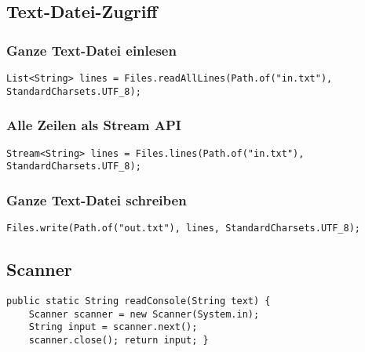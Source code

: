 \begin{multicols*}{5}
		\subsection{Text-Datei-Zugriff}
			\subsubsection{Ganze Text-Datei einlesen}
				\begin{lstlisting}
List<String> lines = Files.readAllLines(Path.of("in.txt"), StandardCharsets.UTF_8);
				\end{lstlisting}
			\subsubsection{Alle Zeilen als Stream API}
				\begin{lstlisting}
Stream<String> lines = Files.lines(Path.of("in.txt"), StandardCharsets.UTF_8);
				\end{lstlisting}
			\subsubsection{Ganze Text-Datei schreiben}
				\begin{lstlisting}
Files.write(Path.of("out.txt"), lines, StandardCharsets.UTF_8);
				\end{lstlisting}

		\subsection{Scanner}
		\begin{lstlisting}
public static String readConsole(String text) {
	Scanner scanner = new Scanner(System.in);
	String input = scanner.next();
	scanner.close(); return input; }
		\end{lstlisting}



\end{multicols*}
